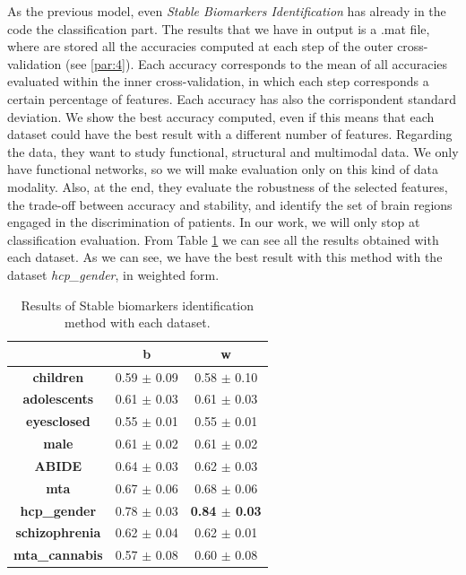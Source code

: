 As the previous model, even \textit{Stable Biomarkers Identification} has already in the code the classification part. The results that we have in output is a .mat file, where are stored all the accuracies computed at each step of the outer cross-validation (see \ref{par:4}). Each accuracy corresponds to the mean of all accuracies evaluated within the inner cross-validation, in which each step corresponds a certain percentage of features. Each accuracy has also the corrispondent standard deviation. We show the best accuracy computed, even if this means that each dataset could have the best result with a different number of features. Regarding the data, they want to study functional, structural and multimodal data. We only have functional networks, so we will make evaluation only on this kind of data modality. Also, at the end, they evaluate the robustness of the selected features, the trade-off between accuracy and stability, and identify the set of brain regions engaged in the discrimination of patients. In our work, we will only stop at classification evaluation. From Table \ref{tab:biomarkers} we can see all the results obtained with each dataset. As we can see, we have the best result with this method with the dataset \textit{hcp\_gender}, in weighted form.
\vspace{0.5cm}

\begin{table}
	\centering
	\begin{tabular}{c|l|c} 
		\toprule
		& \multicolumn{1}{c|}{b} & w                \\ 
		\midrule
		\textbf{children}      & 0.59 $\pm$ 0.09        & 0.58 $\pm$ 0.10  \\
		\textbf{adolescents}   & 0.61 $\pm$ 0.03        & 0.61 $\pm$ 0.03  \\
		\textbf{eyesclosed}    & 0.55 $\pm$ 0.01        & 0.55 $\pm$ 0.01  \\
		\textbf{male}          & 0.61 $\pm$ 0.02        & 0.61 $\pm$ 0.02  \\
		\textbf{ABIDE}         & 0.64 $\pm$ 0.03        & 0.62 $\pm$ 0.03  \\
		\textbf{mta}           & 0.67 $\pm$ 0.06        & 0.68 $\pm$ 0.06  \\
		\textbf{hcp\_gender}   & 0.78 $\pm$ 0.03        & \textbf{0.84 $\pm$ 0.03}  \\
		\textbf{schizophrenia} & 0.62 $\pm$ 0.04        & 0.62 $\pm$ 0.01  \\
		\textbf{mta\_cannabis} & 0.57 $\pm$ 0.08        & 0.60 $\pm$ 0.08 
	\end{tabular}
\caption{Results of Stable biomarkers identification method with each dataset.}
\label{tab:biomarkers}
\end{table}

